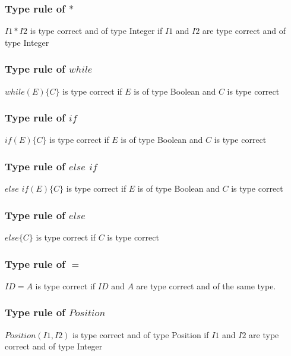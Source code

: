 	\subsubsection*{Type rule of $*$}
		$I1 * I2$ is type correct and of type Integer
		if $I1$ and $I2$ are type correct and of type Integer
	\subsubsection*{Type rule of $while$}
		$while(E)\{C\}$ is type correct
		if $E$ is of type Boolean and $C$ is type correct
	\subsubsection*{Type rule of $if$}
		$if(E)\{C\}$ is type correct
		if $E$ is of type Boolean and $C$ is type correct
	\subsubsection*{Type rule of $else$ $if$}
		$else$ $if(E)\{C\}$ is type correct
		if $E$ is of type Boolean and $C$ is type correct
	\subsubsection*{Type rule of $else$}
		$else\{C\}$ is type correct
		if $C$ is type correct
	\subsubsection*{Type rule of $=$}
		$ID = A$ is type correct
		if $ID$ and $A$ are type correct and of the same type.
	\subsubsection*{Type rule of $Position$}
		$Position(I1,I2)$ is type correct and of type Position
		if $I1$ and $I2$ are type correct and of type Integer
	
		